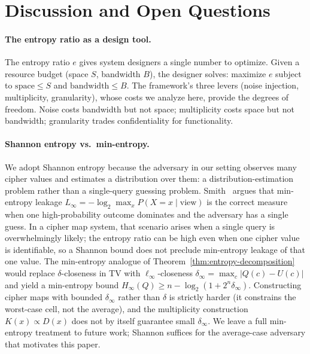 \documentclass[conference]{IEEEtran}
\theoremstyle{definition}
\theoremstyle{plain}
\theoremstyle{remark}
\begin{document}
\section{Discussion and Open Questions}
\label{sec:discussion}

\paragraph{The entropy ratio as a design tool.}
The entropy ratio $e$ gives system designers a single number to
optimize.  Given a resource budget (space $S$, bandwidth $B$), the
designer solves: maximize $e$ subject to $\text{space} \leq S$ and
$\text{bandwidth} \leq B$.  The framework's three levers (noise
injection, multiplicity, granularity), whose costs we analyze here,
provide the degrees of freedom.  Noise costs bandwidth but not space;
multiplicity costs space but not bandwidth; granularity trades
confidentiality for functionality.

\paragraph{Shannon entropy vs.\ min-entropy.}
We adopt Shannon entropy because the adversary in our setting observes
many cipher values and estimates a distribution over them: a
distribution-estimation problem rather than a single-query guessing
problem.  Smith~\cite{smith2009foundations} argues that min-entropy
leakage $L_\infty = -\log_2 \max_x P(X = x \mid \mathrm{view})$ is the
correct measure when one high-probability outcome dominates and the
adversary has a single guess.  In a cipher map system, that scenario
arises when a single query is overwhelmingly likely; the entropy ratio
can be high even when one cipher value is identifiable, so a Shannon
bound does not preclude min-entropy leakage of that one value.  The
min-entropy analogue of Theorem~\ref{thm:entropy-decomposition} would
replace $\delta$-closeness in TV with $\ell_\infty$-closeness
$\delta_\infty = \max_c |Q(c) - U(c)|$ and yield a min-entropy bound
$H_\infty(Q) \geq n - \log_2(1 + 2^n \delta_\infty)$.  Constructing
cipher maps with bounded $\delta_\infty$ rather than $\delta$ is
strictly harder (it constrains the worst-case cell, not the average),
and the multiplicity construction $K(x) \propto D(x)$ does not by
itself guarantee small $\delta_\infty$.  We leave a full min-entropy
treatment to future work; Shannon suffices for the average-case
adversary that motivates this paper.
\end{document}
